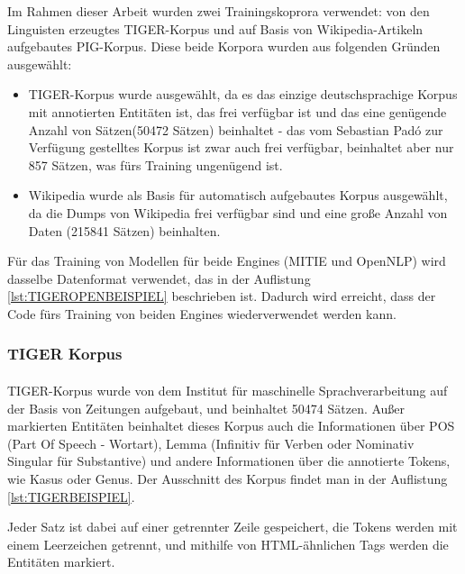Im Rahmen dieser Arbeit wurden zwei Trainingskoprora verwendet: von den Linguisten erzeugtes TIGER-Korpus und auf Basis von Wikipedia-Artikeln aufgebautes PIG-Korpus. Diese beide Korpora wurden aus folgenden Gründen ausgewählt:
\begin{itemize}
\item TIGER-Korpus wurde ausgewählt, da es das einzige deutschsprachige Korpus mit annotierten Entitäten ist, das frei verfügbar ist und das eine genügende Anzahl von Sätzen(50472 Sätzen) beinhaltet - das vom Sebastian Padó\cite{faruqui10:_training} zur Verfügung gestelltes Korpus ist zwar auch frei verfügbar, beinhaltet aber nur 857 Sätzen, was fürs Training ungenügend ist.
\item Wikipedia wurde als Basis für automatisch aufgebautes Korpus ausgewählt, da die Dumps von Wikipedia frei verfügbar sind und eine große Anzahl von Daten (215841 Sätzen) beinhalten.
\end{itemize}

Für das Training von Modellen für beide Engines (MITIE und OpenNLP) wird dasselbe Datenformat verwendet, das in der Auflistung \ref{lst:TIGEROPENBEISPIEL} beschrieben ist. Dadurch wird erreicht, dass der Code fürs Training von beiden Engines wiederverwendet werden kann.



\subsubsection{TIGER Korpus}
\paragraph{}
TIGER-Korpus wurde von dem Institut für maschinelle Sprachverarbeitung\cite{brants2004tiger} auf der Basis von Zeitungen aufgebaut, und beinhaltet 50474 Sätzen. Außer markierten Entitäten beinhaltet dieses Korpus auch die Informationen über POS (Part Of Speech - Wortart), Lemma (Infinitiv für Verben oder Nominativ Singular für Substantive) und andere Informationen über die annotierte Tokens, wie Kasus oder Genus. Der Ausschnitt des Korpus findet man in der Auflistung \ref{lst:TIGERBEISPIEL}.


Jeder Satz ist dabei auf einer getrennter Zeile gespeichert, die Tokens werden mit einem Leerzeichen getrennt, und mithilfe von HTML-ähnlichen Tags werden die Entitäten markiert.

